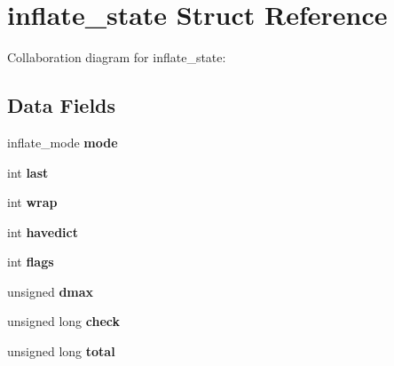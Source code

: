 \hypertarget{structinflate__state}{\section{inflate\-\_\-state Struct Reference}
\label{d4/d4e/structinflate__state}
}


Collaboration diagram for inflate\-\_\-state\-:
\subsection*{Data Fields}
\begin{DoxyCompactItemize}
\item 
\hypertarget{structinflate__state_a9c7906fee7eeeb450b13576531ca639d}{inflate\-\_\-mode {\bfseries mode}}\label{d4/d4e/structinflate__state_a9c7906fee7eeeb450b13576531ca639d}

\item 
\hypertarget{structinflate__state_ab3cbcd2c5ff3b0b8b34ef402a13afdf7}{int {\bfseries last}}\label{d4/d4e/structinflate__state_ab3cbcd2c5ff3b0b8b34ef402a13afdf7}

\item 
\hypertarget{structinflate__state_a990d157b5c0d4ba178c3361de9ce6561}{int {\bfseries wrap}}\label{d4/d4e/structinflate__state_a990d157b5c0d4ba178c3361de9ce6561}

\item 
\hypertarget{structinflate__state_a2eb1cd634ed6baade952ffa5938ebcdc}{int {\bfseries havedict}}\label{d4/d4e/structinflate__state_a2eb1cd634ed6baade952ffa5938ebcdc}

\item 
\hypertarget{structinflate__state_a9dcf6151443750d75b2283d0a3e62c39}{int {\bfseries flags}}\label{d4/d4e/structinflate__state_a9dcf6151443750d75b2283d0a3e62c39}

\item 
\hypertarget{structinflate__state_ae3d433011714e673b22e82156acc4416}{unsigned {\bfseries dmax}}\label{d4/d4e/structinflate__state_ae3d433011714e673b22e82156acc4416}

\item 
\hypertarget{structinflate__state_ae597e4f5c37b9f7881015384bf826371}{unsigned long {\bfseries check}}\label{d4/d4e/structinflate__state_ae597e4f5c37b9f7881015384bf826371}

\item 
\hypertarget{structinflate__state_af9d1071eb75b1ee37a151ccec8dfee95}{unsigned long {\bfseries total}}\label{d4/d4e/structinflate__state_af9d1071eb75b1ee37a151ccec8dfee95}


\end{DoxyCompactItemize}
